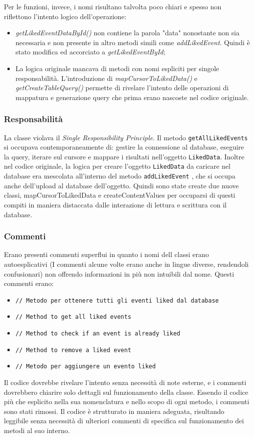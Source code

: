 Per le funzioni, invece, i nomi risultano talvolta poco chiari e spesso non riflettono l'intento logico dell'operazione: \begin{itemize} 
\item \textit{getLikedEventDataById()} non contiene la parola "data" nonostante non sia necessaria e non presente in altro metodi simili come \textit{addLikedEvent}. Quindi è stato modifica ed accorciato a \textit{getLikedEventById}; 
\item La logica originale mancava di metodi con nomi espliciti per singole responsabilità. L'introduzione di \textit{mapCursorToLikedData()} e \textit{getCreateTableQuery()} permette di rivelare l'intento delle operazioni di mappatura e generazione query che prima erano nascoste nel codice originale. \end{itemize}


\subsubsection{Responsabilità}
La classe violava il \textit{Single Responsibility Principle}. Il metodo \texttt{getAllLikedEvents} si occupava contemporaneamente di: gestire la connessione al database, eseguire la query, iterare sul cursore e mappare i risultati nell'oggetto \texttt{LikedData}. Inoltre nel codice originale, la logica per creare l'oggetto \verb|LikedData| da caricare nel database era mescolata all'interno del metodo \verb|addLikedEvent| , che si occupa anche dell'upload al database dell'oggetto. Quindi sono state create due nuove classi, mapCursorToLikedData e createContentValues per occuparsi di questi compiti in maniera distaccata dalle interazione di lettura e scrittura con il database. 

\subsubsection{Commenti}
Erano presenti commenti superflui in quanto i nomi dell classi erano autoesplicativi (I commenti alcune volte erano anche in lingue diverse, rendendoli confusionari) non offrendo informazioni in più non intuibili dal nome. Questi commenti erano:
\begin{itemize}
    \item \texttt{// Metodo per ottenere tutti gli eventi liked dal database} 
    \item     \texttt{// Method to get all liked events}
    \item   \texttt{// Method to check if an event is already liked}
    \item \texttt{// Method to remove a liked event}
    \item \texttt{// Metodo per aggiungere un evento liked}
\end{itemize}
Il codice dovrebbe rivelare l'intento senza necessità di note esterne, e i commenti dovrebbero chiarire solo dettagli sul funzionamento della classe. Essendo il codice più che esplicito nella sua nomenclatura e nello scopo di ogni metodo, i commenti sono stati rimossi. Il codice è strutturato in maniera adeguata, risultando leggibile senza necessità di ulteriori commenti di specifica sul funzionamento dei metodi al suo interno.


